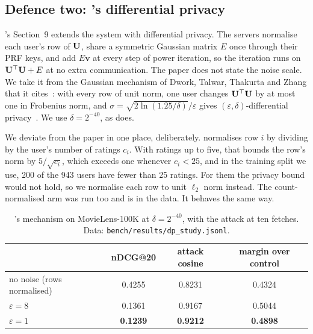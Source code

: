 \subsection{Defence two: \nudgeplain{}'s differential privacy}
\label{sec:leak:dp}

\nudgeplain{}'s Section~9 extends the system with differential privacy. The
servers normalise each user's row of $\mathbf{U}$, share a symmetric Gaussian
matrix $E$ once through their PRF keys, and add $E\mathbf{v}$ at every step of
power iteration, so the iteration runs on $\mathbf{U}^{\top}\mathbf{U} + E$ at no extra
communication. The paper does not state the noise scale. We take it from the
Gaussian mechanism of Dwork, Talwar, Thakurta and Zhang that it
cites~\cite{analyzegauss2014}: with every row of unit norm, one user changes
$\mathbf{U}^{\top}\mathbf{U}$ by at most one in Frobenius norm, and $\sigma =
\sqrt{2 \ln (1.25/\delta)}/\varepsilon$ gives $(\varepsilon, \delta)$-differential
privacy~\cite{dwork2014}. We use $\delta = 2^{-40}$, as \nudgeplain{} does.

We deviate from the paper in one place, deliberately. \nudgeplain{} normalises
row $i$ by dividing by the user's number of ratings $c_i$. With ratings up to
five, that bounds the row's norm by $5/\sqrt{c_i}$, which exceeds one whenever
$c_i < 25$, and in the training split we use, 200 of the 943 users have fewer than
25 ratings. For them the privacy bound would not hold, so we normalise each row to
unit $\ell_2$ norm instead. The count-normalised arm was run too and is in the data. It behaves the
same way.

\begin{table}[t]
\centering
\small
\caption{\nudgeplain{}'s mechanism on MovieLens-100K at $\delta = 2^{-40}$,
with the attack at ten fetches. Data: \texttt{bench/results/dp\_study.jsonl}.}
\label{tab:dp}
\begin{tabular}{@{}lccc@{}}
\toprule
 & nDCG@20 & attack cosine & margin over control \\
\midrule
no noise (rows normalised) & 0.4255 & 0.8231 & 0.4324 \\
$\varepsilon = 8$ & 0.1361 & 0.9167 & 0.5044 \\
$\varepsilon = 1$ & \textbf{0.1239} & \textbf{0.9212} & \textbf{0.4898} \\
\bottomrule
\end{tabular}
\end{table}

